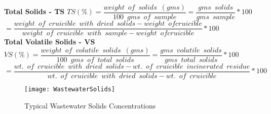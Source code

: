\vspace{0.4cm}
\textbf{Total Solids - TS}			
\vspace{0.4cm}
$TS(\%)=\dfrac{weight \enspace of \enspace solids \enspace (gms)}{100 \enspace gms \enspace of \enspace sample}=\dfrac{gms \enspace solids}{gms \enspace sample}*100$\\
\vspace{0.3cm}
\hspace{1.2cm}$=\dfrac{weight \enspace of \enspace cruicible \enspace with \enspace dried  \enspace solids - weight \enspace of cruicible}{weight \enspace of \enspace cruicible \enspace with \enspace sample - weight \enspace of cruicible}*100$\\
\vspace{0.4cm}
\textbf{Total Volatile Solids - VS}		
\vspace{0.4cm}
$VS(\%)=\dfrac{weight \enspace of \enspace volatile \enspace solids \enspace (gms)}{100 \enspace gms \enspace of \enspace total \enspace solids}=\dfrac{gms \enspace volatile \enspace solids}{gms \enspace total \enspace solids}*100$\\
\vspace{0.3cm}
\hspace{1.2cm}$=\dfrac{wt. \enspace of \enspace cruicible  \enspace with \enspace dried  \enspace solids - wt. \enspace of \enspace cruicible \enspace incinerated \enspace residue}{wt. \enspace of \enspace cruicible  \enspace with \enspace dried  \enspace solids - wt. \enspace of \enspace cruicible}*100$\\

\newpage
\thispagestyle{empty}

				\newpage
				\thispagestyle{empty}
				\begin{sidewaysfigure}
					\begin{center}
						\texttt{[image: WastewaterSolids]}\\
						\caption{Typical Wastewater Solids Concentrations}
					\end{center}
				\end{sidewaysfigure}
